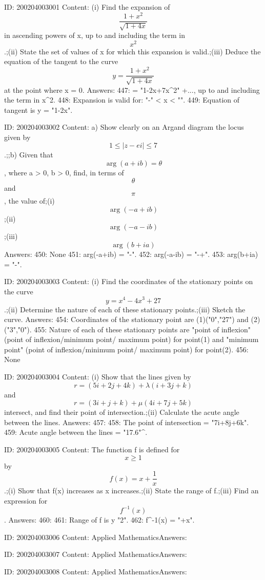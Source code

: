 \documentclass{article}
\begin{document}
ID: 200204003001
Content:
(i) Find the expansion of  $$\frac{1+x^2}{\sqrt{1 + 4x}}$$ in ascending powers of x, up to and including the term in  $$x^2 $$.;(ii) State the set of values of x for which this expansion is valid.;(iii) Deduce the equation of the tangent to the curve  $$y = \frac{1+x^2}{\sqrt{1 + 4x}}$$ at the point where x = 0.  Answers:
447:  = "1-2x+7x^2" +..., up to and including the term in x^2.
448: Expansion is valid for: "-" < x < "".
449: Equation of tangent is y = "1-2x".

ID: 200204003002
Content:
a)  Show clearly on an Argand diagram the locus given by  $$1 \le | z - ei | \le 7$$.;;b) Given that  $$\arg (a + ib ) = \theta $$, where a > 0, b > 0, find, in terms of  $$\theta $$ and  $$\pi $$, the value of;(i) $$\arg (-a + ib)$$;(ii) $$\arg (-a - ib)$$;(iii) $$\arg (b + ia)$$Answers:
450: None
451: arg(-a+ib) = "\pi-\theta".
452: arg(-a-ib) = "-\pi+\theta".
453: arg(b+ia) = "\pi-\theta".

ID: 200204003003
Content:
(i) Find the coordinates of the stationary points on the curve  $$y = x^4  - 4x^3  + 27$$.;(ii) Determine the nature of each of these stationary points.;(iii) Sketch the curve. Answers:
454: Coordinates of the stationary point are (1)("0","27") and (2)("3","0").
455: Nature of each of these stationary points are "point of inflexion" (point of inflexion/minimum point/ maximum point) for point(1) and "minimum point" (point of inflexion/minimum point/ maximum point) for point(2).
456: None

ID: 200204003004
Content:
(i) Show that the lines given by  $$r = ( 5i + 2j + 4k ) + \lambda ( i + 3j + k )$$ and  $$r = ( 3i + j + k ) + \mu ( 4i + 7j + 5k )$$ intersect, and find their point of intersection.;(ii) Calculate the acute angle between the lines. Answers:
457: 
458: The point of intersection = "7i+8j+6k".
459: Acute angle between the lines = "17.6"^{\circ}.

ID: 200204003005
Content:
The function f is defined for  $$x \ge 1$$ by  $$f( x ) = x + \frac{1}{x}$$.;(i) Show that f(x) increases as x increases.;(ii) State the range of f.;(iii) Find an expression for  $$f^{-1}( x )$$. Answers:
460: 
461: Range of f is y \geq "2".
462: f^{-1}(x) = "+x".

ID: 200204003006
Content:
Applied MathematicsAnswers:

ID: 200204003007
Content:
Applied MathematicsAnswers:

ID: 200204003008
Content:
Applied MathematicsAnswers:
\end{document}

